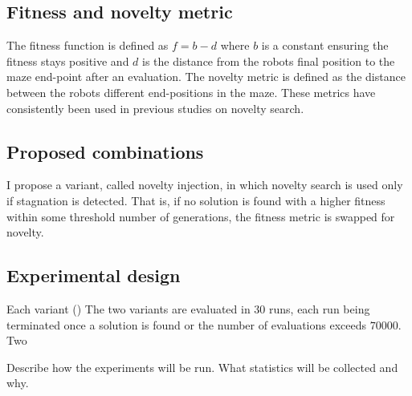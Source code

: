 \subsection{Fitness and novelty metric}
The fitness function is defined as $f = b - d$ where $b$ is a constant ensuring the fitness stays positive
and $d$ is the distance from the robots final position to the maze end-point after an evaluation.
The novelty metric is defined as the distance between the robots different end-positions in the maze.
These metrics have consistently been used in previous studies on novelty search.

\subsection{Proposed combinations}
I propose a variant, called novelty injection, in which novelty search is used only if stagnation is detected. That is, if no
solution is found with a higher fitness within some threshold number of generations, the fitness metric is swapped for novelty.

\subsection{Experimental design}
Each variant ()
The two variants are evaluated in 30 runs, each run being terminated once a solution is found
or the number of evaluations exceeds $70 000$. Two

Describe how the experiments will be run. What statistics will be collected and why.
